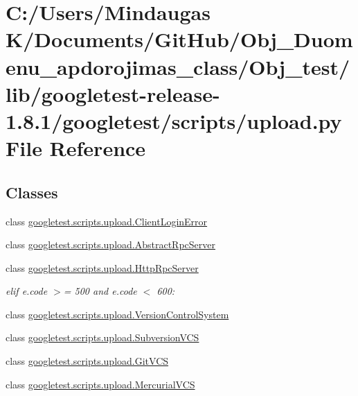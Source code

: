 \hypertarget{_obj__test_2lib_2googletest-release-1_88_81_2googletest_2scripts_2upload_8py}{}\section{C\+:/\+Users/\+Mindaugas K/\+Documents/\+Git\+Hub/\+Obj\+\_\+\+Duomenu\+\_\+apdorojimas\+\_\+class/\+Obj\+\_\+test/lib/googletest-\/release-\/1.8.1/googletest/scripts/upload.py File Reference}
\label{_obj__test_2lib_2googletest-release-1_88_81_2googletest_2scripts_2upload_8py}
\subsection*{Classes}
\begin{DoxyCompactItemize}
\item 
class \mbox{\hyperlink{classgoogletest_1_1scripts_1_1upload_1_1_client_login_error}{googletest.\+scripts.\+upload.\+Client\+Login\+Error}}
\item 
class \mbox{\hyperlink{classgoogletest_1_1scripts_1_1upload_1_1_abstract_rpc_server}{googletest.\+scripts.\+upload.\+Abstract\+Rpc\+Server}}
\item 
class \mbox{\hyperlink{classgoogletest_1_1scripts_1_1upload_1_1_http_rpc_server}{googletest.\+scripts.\+upload.\+Http\+Rpc\+Server}}
\begin{DoxyCompactList}\small\item\em elif e.\+code $>$= 500 and e.\+code $<$ 600\+: \end{DoxyCompactList}\item 
class \mbox{\hyperlink{classgoogletest_1_1scripts_1_1upload_1_1_version_control_system}{googletest.\+scripts.\+upload.\+Version\+Control\+System}}
\item 
class \mbox{\hyperlink{classgoogletest_1_1scripts_1_1upload_1_1_subversion_v_c_s}{googletest.\+scripts.\+upload.\+Subversion\+V\+CS}}
\item 
class \mbox{\hyperlink{classgoogletest_1_1scripts_1_1upload_1_1_git_v_c_s}{googletest.\+scripts.\+upload.\+Git\+V\+CS}}
\item 
class \mbox{\hyperlink{classgoogletest_1_1scripts_1_1upload_1_1_mercurial_v_c_s}{googletest.\+scripts.\+upload.\+Mercurial\+V\+CS}}
\end{DoxyCompactItemize}
